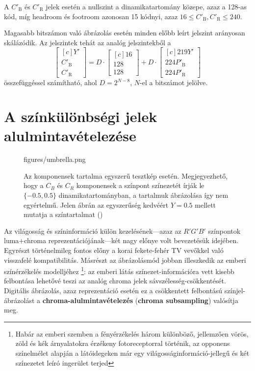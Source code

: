 A $C'_\mathrm{B}$ és $C'_\mathrm{R}$ jelek esetén a nullszint a dinamikatartomány közepe, azaz a 128-as kód, míg headroom és footroom azonosan 15 kódnyi, azaz $16 \leq C'_\mathrm{B}, C'_\mathrm{R} \leq 240$.

Magasabb bitszámon való ábrázolás esetén minden előbb leírt jelszint arányosan skálázódik.
Az \ycbcr jelszintek tehát az \ypbpr analóg jelszintekből a 
\begin{equation}
\begin{bmatrix}[c]
       Y' \\[0.3em]
       C'_{\mathrm{B}} \\[0.3em]
       C'_{\mathrm{R}} \end{bmatrix}
       =
D\cdot
\begin{bmatrix}[c]
       16 \\[0.3em]
       128 \\[0.3em]
       128 \end{bmatrix}
+
D\cdot
\begin{bmatrix}[c]
       219 Y' \\[0.3em]
       224 P'_\mathrm{B} \\[0.3em]
       224 P'_{\mathrm{R}} \end{bmatrix}
\end{equation}
összefüggéssel számítható, ahol $D = 2^{N-8}$, $N$-el a bitszámot jelölve.

\section{A színkülönbségi jelek alulmintavételezése}

\begin{figure}[]
	\centering
	\begin{overpic}[width = 1\columnwidth ]{figures/umbrella.png}
 	\end{overpic}
	\caption{Az \ycbcr komponensek tartalma egyszerű tesztkép esetén.
	Megjegyezhető, hogy a $C_B$ és $C_R$ komponensek a színpont színezetét írják le $\lbrace -0.5, 0.5\rbrace$ dinamikatartományban, a tartalmuk ábrázolása így nem egyértelmű.
	Jelen ábrán az egyszerűség kedvéért $Y=0.5$ mellett mutatja a színtartalmat ()}
	\label{Fig:umbrella}
\end{figure}
%
Az világosság és színinformáció külön kezelésének---azaz az $R'G'B'$ színpontok luma+chroma reprezentációjának---két nagy előnye volt bevezetésük idejében.
Egyrészt történelmileg fontos előny a korai fekete-fehér TV vevőkkel való visszafelé kompatibilitás.
Másrészt az ábrázolásmód jobban illeszkedik az emberi színérzékelés modelljéhez \footnote{Habár az emberi szemben a fényérzékelés három különböző, jellemzően vörös, zöld és kék árnyalatokra érzékeny fotoreceptorral történik, az opponens színelmélet alapján a látóidegeken már egy világosságinformáció-jellegű és két színezetet leíró ingerület terjed}:
az emberi látás színezet-információra vett kisebb felbontása lehetővé teszi az analóg chroma jelek sávszélesség-csökkentését.
Digitális ábrázolás, azaz \ycbcr reprezentáció esetén ez a csökkentett felbontású színjel-ábrázolást a \textbf{chroma-alulmintavételezés} (\textbf{chroma subsampling}) valósítja meg.

